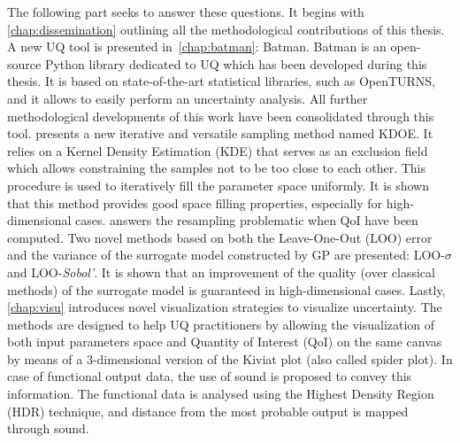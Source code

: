 The following part seeks to answer these questions. It begins with \cref{chap:dissemination} outlining all the methodological contributions of this thesis. A new UQ tool is presented in~\cref{chap:batman}: Batman. Batman is an open-source Python library dedicated to UQ which has been developed during this thesis. It is based on state-of-the-art statistical libraries, such as OpenTURNS, and it allows to easily perform an uncertainty analysis. All further methodological developments of this work have been consolidated through this tool.  presents a new iterative and versatile sampling method named KDOE. It relies on a Kernel Density Estimation (KDE) that serves as an exclusion field which allows constraining the samples not to be too close to each other. This procedure is used to iteratively fill the parameter space uniformly. It is shown that this method provides good space filling properties, especially for high-dimensional cases.  answers the resampling problematic when QoI have been computed. Two novel methods based on both the Leave-One-Out (LOO) error and the variance of the surrogate model constructed by GP are presented: LOO-$\sigma$ and LOO-\emph{Sobol'}. It is shown that an improvement of the quality (over classical methods) of the surrogate model is guaranteed in high-dimensional cases. Lastly, \cref{chap:visu} introduces novel visualization strategies to visualize uncertainty. The methods are designed to help UQ practitioners by allowing the visualization of both input parameters space and  Quantity of Interest (QoI) on the same canvas by means of a 3-dimensional version of the Kiviat plot (also called spider plot). In case of functional output data, the use of sound is proposed to convey this information. The functional data is analysed using the Highest Density Region (HDR) technique, and distance from the most probable output is mapped through sound.\\
 
